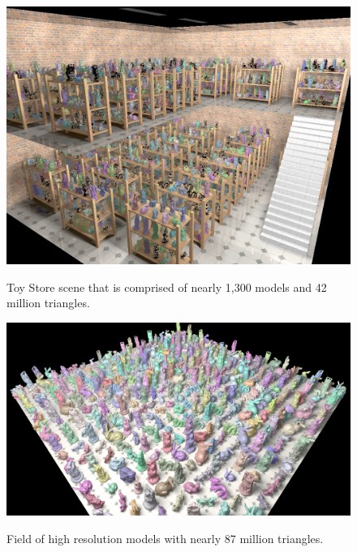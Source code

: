 \documentclass[12pt]{ucthesis}
\newcommand{\captionfonts}{\small\bf\ssp}
\begin{document}
\begin{figure}[h!]
    \centering
    \includegraphics[width=140mm]{showoff/toystore.png}
    \captionfonts
    \caption{Toy Store scene that is comprised of nearly 1,300 models and 42 million triangles.}
    \label{fig:sotoystore}
\end{figure}

\begin{figure}[h!]
    \centering
    \includegraphics[width=140mm]{showoff/field.png}
    \captionfonts
    \caption{Field of high resolution models with nearly 87 million triangles.}
    \label{fig:sofield}
\end{figure}
\end{document}
